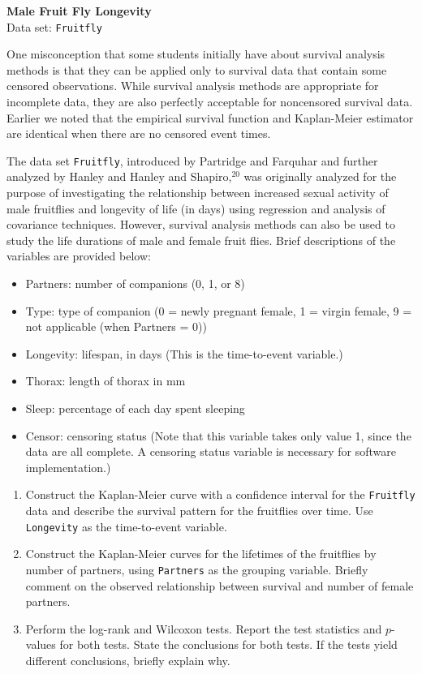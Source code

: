 \documentclass[
]{report}
\begin{document}
\begin{list}{E.}{ \setlength{\itemsep}{1.2em}}
  \item \textbf{Male Fruit Fly Longevity}\\
  Data set: \texttt{Fruitfly}

One misconception that some students initially have about survival analysis methods is that they can be applied only to survival data that contain some censored observations. While survival analysis methods are appropriate for incomplete data, they are also perfectly acceptable for noncensored survival data. Earlier we noted that the empirical survival function and Kaplan-Meier estimator are identical when there are no censored event times.

The data set \texttt{Fruitfly}, introduced by Partridge and Farquhar and further analyzed by Hanley and Hanley and Shapiro,$^{20}$ was originally analyzed for the purpose of investigating the relationship between increased sexual activity of male fruitflies and longevity of life (in days) using regression and analysis of covariance techniques. However, survival analysis methods can also be used to study the life durations of male and female fruit flies. Brief descriptions of the variables are provided below:
\begin{itemize}
  \item Partners: number of companions (0, 1, or 8)
  \item Type: type of companion (0 = newly pregnant female, 1 = virgin female, 9 = not applicable (when Partners = 0))
  \item Longevity: lifespan, in days (This is the time-to-event variable.)
  \item Thorax: length of thorax in mm
  \item Sleep: percentage of each day spent sleeping
  \item Censor: censoring status (Note that this variable takes only value 1, since the data are all complete. A censoring status variable is necessary for software implementation.)
\end{itemize}
  \begin{enumerate}
    \item Construct the Kaplan-Meier curve with a confidence interval for the \texttt{Fruitfly} data and describe the survival pattern for the fruitflies over time. Use \texttt{Longevity} as the time-to-event variable.
    \item Construct the Kaplan-Meier curves for the lifetimes of the fruitflies by number of partners, using \texttt{Partners} as the grouping variable. Briefly comment on the observed relationship between survival and number of female partners.
    \item Perform the log-rank and Wilcoxon tests. Report the test statistics and $p$-values for both tests. State the conclusions for both tests. If the tests yield different conclusions, briefly explain why.
  \end{enumerate}


\end{list}
\end{document}
